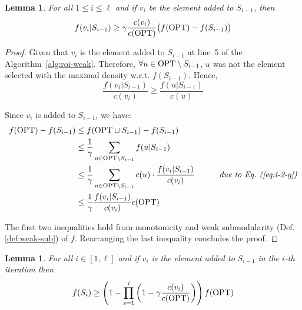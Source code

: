 \documentclass[10pt]{article} %
\newtheorem{lemma}[theorem]{Lemma}
\theoremstyle{remark}
\newcommand{\OPT}{{\rm OPT}}
\begin{document}
\begin{lemma}
\label{lem:marginal-gain-g}
For all $1 \leq i \leq \ell$ and if $v_i$ be the element added to $S_{i-1}$, then
\[ 
f(v_i|S_{i-1}) \geq \gamma \frac{c(v_i)}{c(\OPT)} \big ( f(\OPT) - f(S_{i-1}) \big ) 
\]
\end{lemma}

\begin{proof} 
Given that $v_i$ is the element added to $S_{i-1}$ at line~5 of the Algorithm~\ref{alg:roi-weak}. Therefore,
$\forall u\in \OPT \setminus S_{i-1}$, $u$ was not the element selected with the maximal density w.r.t.  $f(S_{i-1})$. Hence, 
\begin{equation}
\frac{f(v_i|S_{i-1})}{c(v_i)}\geq \frac{f(u|S_{i-1})}{c(u)}
\label{eq:i-2-g}
\end{equation}

Since $v_i$ is added to $S_{i-1}$, we have: 
\begin{align*}
     f(\OPT)-f(S_{i-1}) &\leq f(\OPT \cup S_{i-1})-f(S_{i-1})\\
     &\leq \frac{1}{\gamma} \sum_{u\in \OPT \setminus S_{i-1}} f(u|S_{i-1})  \\
    &\leq \frac{1}{\gamma} \sum_{u\in \OPT \setminus S_{i-1}} c(u) \cdot \frac{f(v_i|S_{i-1})}{c(v_i)}  \quad\quad\quad\mbox{\it  due to Eq.~(\ref{eq:i-2-g})} \\
    &\leq \frac{1}{\gamma} \frac{f(v_i|S_{i-1})}{c(v_i)} c(\OPT)
\end{align*}

The first two inequalities hold from monotonicity and weak submodularity (Def. \ref{def:weak-sub}) of $f$. Rearranging the last inequality concludes the proof.  
\end{proof}


\begin{lemma}
\label{lem:f-Si-g}
For all $i\in [1,\ell]$ and if $v_i$ is the element added to $S_{i-1}$ in the $i$-th iteration then
\begin{equation}
    \label{eq:f-Si-g}
    f(S_{i}) \geq \left(1- \prod_{s=1}^{i} \left(1- \gamma \frac{c(v_i)}{c(\OPT)} \right)   \right) f(\OPT)
\end{equation}

\end{lemma}


\end{document}

